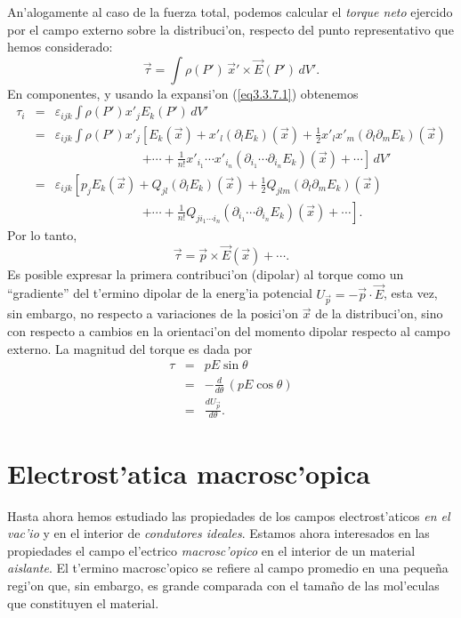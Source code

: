 An'alogamente al caso de la fuerza total, podemos calcular el \textit{torque
neto} ejercido por el campo externo sobre la distribuci'on, respecto del punto
representativo que hemos considerado:
\begin{equation}
\vec{\tau} = \int \rho(P')\,\vec{x}'\times\vec{E}(P')\,dV' .
\end{equation}
En componentes, y usando la expansi'on (\ref{eq3.3.7.1}) obtenemos
\begin{eqnarray}
\tau_i &=& \varepsilon_{ijk}\int\rho(P')x'_jE_k(P')\,dV' \\
&=&\varepsilon_{ijk}\int\rho(P')x'_j\left[
E_k(\vec{x})+x'_l(\partial_lE_k)(\vec{x})+\frac{1}{2}
x'_lx'_m(\partial_l\partial_mE_k)(\vec{x}) \right.\nonumber\\
&&\quad\qquad\qquad\qquad\left.+\cdots+\frac{1}{n!}x'_{i_1}\cdots
x'_{i_n}(\partial_{i_1}\cdots\partial_{i_n}E_k)(\vec
{x})+\cdots\right] \,dV' \\
&=&\varepsilon_{ijk}\left[p_j
E_k(\vec{x})+Q_{jl}(\partial_lE_k)(\vec{x})+\frac{1}{2}
Q_{jlm}(\partial_l\partial_mE_k)(\vec{x})\right.\nonumber\\
&&\quad\qquad\qquad\qquad\left.+\cdots+\frac{1}{n!}Q_{ji_1\cdots i_n}(\partial_{i_1}\cdots\partial_{i_n}
E_k)(\vec
{x})+\cdots\right] .
\end{eqnarray}
Por lo tanto,
\begin{equation}
\label{eq3.3.14}
\boxed{\vec{\tau}=\vec{p}\times\vec{E}(\vec{x})+\cdots. }
\end{equation}
Es posible expresar la primera contribuci'on (dipolar) al torque como un
``gradiente'' del t'ermino dipolar de la energ'ia potencial
$U_{\vec{p}}=-\vec{p}\cdot\vec{E}$, esta vez, sin embargo, no respecto a
variaciones de la posici'on $\vec{x}$ de la distribuci'on, sino con respecto a
cambios en la orientaci'on del momento dipolar respecto al campo
externo. La magnitud del torque es dada por
\begin{eqnarray}
\tau &=& pE\sin\theta \nonumber \\
&=& -\frac{d}{d\theta}\,\left(pE\cos\theta\right)\\
&=&\frac{dU_{\vec{p}}}{d\theta}.  \label{eq3.3.15}
\end{eqnarray}

\newpage


\newpage

\section{Electrost'atica macrosc'opica}
Hasta ahora hemos estudiado las propiedades de los campos
electrost'aticos \textit{en el vac'io} y en el interior de \textit{condutores ideales}.
Estamos ahora interesados en las propiedades el campo el'ectrico \textit{macrosc'opico} en el interior de un material \textit{aislante}. El t'ermino macrosc'opico se refiere al campo promedio en una peque\~na regi'on que, sin embargo, es grande comparada con el tama\~no de las mol'eculas que constituyen el material.

